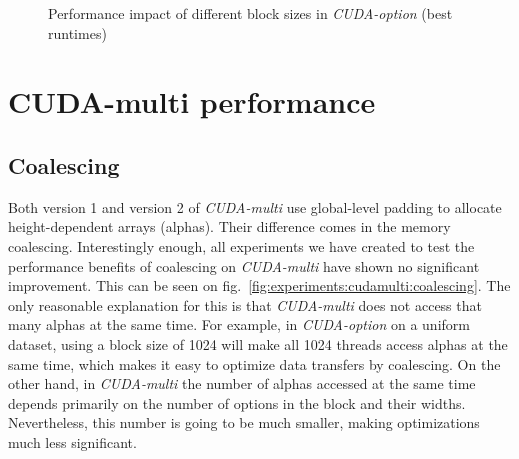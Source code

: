 \begin{figure}[H]
\begin{subfigure}{.49\textwidth}
\end{subfigure}
\begin{center}
  \small
\end{center}
\begin{center}
  \small
\end{center}
\caption{Performance impact of different block sizes in \textit{CUDA-option} (best runtimes)}
\label{fig:experiments:cudaoption:blocks}
\end{figure}

\section{CUDA-multi performance}
\subsection{Coalescing}
Both version 1 and version 2 of \textit{CUDA-multi} use global-level padding to allocate height-dependent arrays (alphas). Their difference comes in the memory coalescing. Interestingly enough, all experiments we have created to test the performance benefits of coalescing on \textit{CUDA-multi} have shown no significant improvement. This can be seen on fig.~\ref{fig:experiments:cudamulti:coalescing}. The only reasonable explanation for this is that \textit{CUDA-multi} does not access that many alphas at the same time. For example, in \textit{CUDA-option} on a uniform dataset, using a block size of 1024 will make all 1024 threads access alphas at the same time, which makes it easy to optimize data transfers by coalescing. On the other hand, in \textit{CUDA-multi} the number of alphas accessed at the same time depends primarily on the number of options in the block and their widths. Nevertheless, this number is going to be much smaller, making optimizations much less significant.

